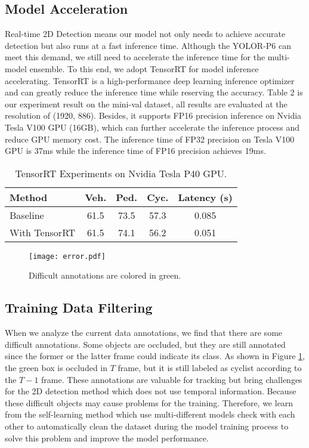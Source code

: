 \documentclass[final]{cvpr}
\begin{document}
\subsection{Model Acceleration}
Real-time 2D Detection means our model not only needs to achieve accurate detection but also runs at a fast inference time. Although the YOLOR-P6 \cite{wang2021you} can meet this demand, we still need to accelerate the inference time for the multi-model ensemble. To this end, we adopt TensorRT for model inference accelerating. TensorRT is a high-performance deep learning inference optimizer and can greatly reduce the inference time while reserving the accuracy. Table 2 is our experiment result on the mini-val dataset, all results are evaluated at the resolution of (1920, 886). Besides, it supports FP16 precision inference on Nvidia Tesla V100 GPU (16GB), which can further accelerate the inference process and reduce GPU memory cost. The inference time of FP32 precision on Tesla V100 GPU is 37ms while the inference time of FP16 precision achieves 19ms. 

\begin{table}[h]
\begin{center}
\caption{TensorRT Experiments on Nvidia Tesla P40 GPU.}
\begin{tabular}{l|c|c|c|c}
\hline
Method  & Veh. & Ped. & Cyc. & Latency (s) \\
\hline
Baseline & 61.5 & 73.5 & 57.3 &  0.085 \\
With TensorRT & 61.5 & 74.1 & 56.2 & 0.051 \\
\hline
\end{tabular}
\label{tensorrtresult}
\end{center}
\end{table}

\begin{figure}
    \centering
    \texttt{[image: error.pdf]}
    \caption{Difficult annotations are colored in green.}
    \label{error}
\end{figure}
\subsection{Training Data Filtering}
When we analyze the current data annotations, we find that there are some difficult annotations. Some objects are occluded, but they are still annotated since the former or the latter frame could indicate its class. As shown in Figure \ref{error}, the green box is occluded in $T$ frame, but it is still labeled as cyclist according to the $T-1$ frame. These annotations are valuable for tracking but bring challenges for the 2D detection method which does not use temporal information. Because these difficult objects may cause problems for the training. Therefore, we learn from the self-learning method which use multi-different models check with each other to automatically clean the dataset during the model training process to solve this problem and improve the model performance.
\end{document}
